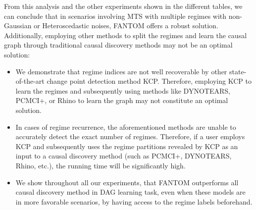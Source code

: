 From this analysis and the other experiments shown in the different tables, we can conclude that in scenarios involving MTS with multiple regimes with non-Gaussian or Heteroscedastic noises, FANTOM offers a robust solution. Additionally, employing other methods to split the regimes and learn the causal graph through traditional causal discovery methods may not be an optimal solution:
\begin{itemize}
    \item We demonstrate that regime indices are not well recoverable by other state-of-the-art change point detection method KCP. Therefore, employing KCP to learn the regimes and subsequently using methods like DYNOTEARS, PCMCI+, or Rhino to learn the graph may not constitute an optimal solution.
    \item In cases of regime recurrence, the aforementioned methods are unable to accurately detect the exact number of regimes. Therefore, if a user employs KCP and subsequently uses the regime partitions revealed by KCP as an input to a causal discovery method (such as PCMCI+, DYNOTEARS, Rhino, etc.), the running time will be significantly high.\\
    \item We show throughout all our experiments, that FANTOM outperforms all causal discovery method in DAG learning task, even when these models are in more favorable scenarios, by having access to the regime labels beforehand.
   
\end{itemize}
